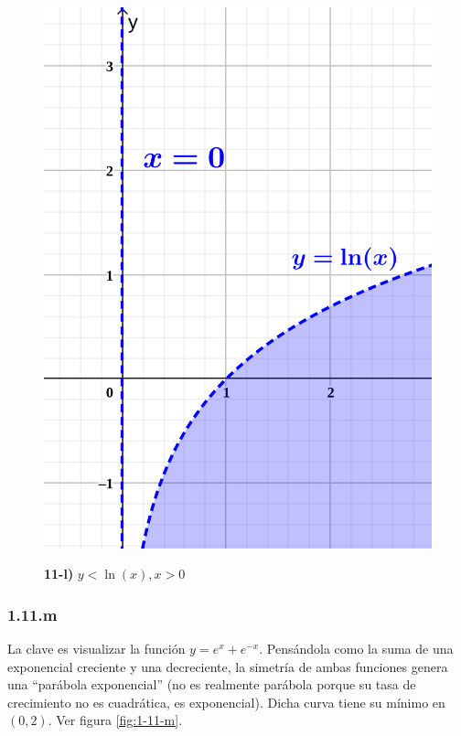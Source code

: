 \documentclass{article}
\begin{document}
\begin{figure}[ht]
\caption{\textbf{11-l)} $y < \ln(x), x > 0$}
\includegraphics[scale=0.75]{img/ejercicios/1/11-l.png} 
\centering
\label{fig:1-11-l}
\end{figure}

\subsubsection*{1.11.m}
\label{subsubsec:1.11.m}

La clave es visualizar la función $y = e^x + e^{-x}$. Pensándola como la suma de una exponencial creciente y una decreciente, la simetría de ambas funciones genera una ``parábola exponencial'' (no es realmente parábola porque su tasa de crecimiento no es cuadrática, es exponencial). Dicha curva tiene su mínimo en $(0, 2)$. Ver figura \ref{fig:1-11-m}.
\end{document}
